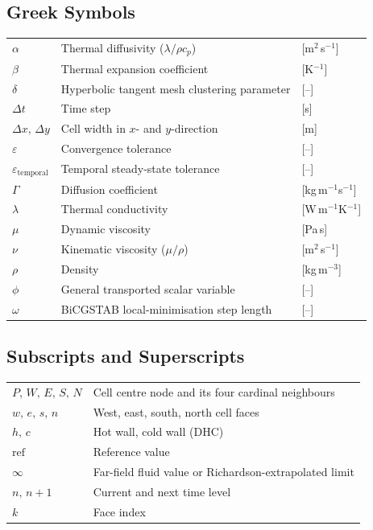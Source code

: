 \subsection*{Greek Symbols}
\begin{tabular}{@{}lll@{}}
    $\alpha$                  & Thermal diffusivity ($\lambda/\rho c_p$)         & [m$^2$\,s$^{-1}$] \\
    $\beta$                   & Thermal expansion coefficient                    & [K$^{-1}$] \\
    $\delta$                  & Hyperbolic tangent mesh clustering parameter     & [--] \\
    $\Delta t$                & Time step                                        & [s] \\
    $\Delta x,\,\Delta y$     & Cell width in $x$- and $y$-direction             & [m] \\
    $\varepsilon$             & Convergence tolerance                            & [--] \\
    $\varepsilon_\text{temporal}$ & Temporal steady-state tolerance             & [--] \\
    $\Gamma$                  & Diffusion coefficient                            & [kg\,m$^{-1}$s$^{-1}$] \\
    $\lambda$                 & Thermal conductivity                             & [W\,m$^{-1}$K$^{-1}$] \\
    $\mu$                     & Dynamic viscosity                                & [Pa\,s] \\
    $\nu$                     & Kinematic viscosity ($\mu/\rho$)                 & [m$^2$\,s$^{-1}$] \\
    $\rho$                    & Density                                          & [kg\,m$^{-3}$] \\
    $\phi$                    & General transported scalar variable              & [--] \\
    $\omega$                  & BiCGSTAB local-minimisation step length          & [--] \\
\end{tabular}

\subsection*{Subscripts and Superscripts}
\begin{tabular}{@{}ll@{}}
    $P,\,W,\,E,\,S,\,N$    & Cell centre node and its four cardinal neighbours \\
    $w,\,e,\,s,\,n$        & West, east, south, north cell faces \\
    $h,\,c$                & Hot wall, cold wall (DHC) \\
    $\text{ref}$           & Reference value \\
    $\infty$               & Far-field fluid value or Richardson-extrapolated limit \\
    $n,\,n+1$              & Current and next time level \\
    $k$                    & Face index \\
\end{tabular}

